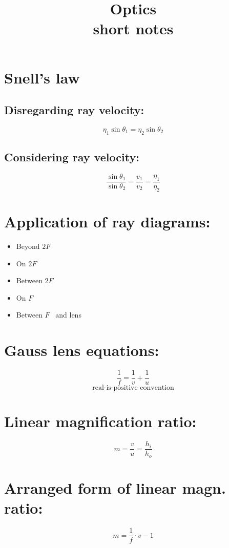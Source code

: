 \documentclass[11pt]{article}
\title{Optics\\
\large short notes
}
\date{}
\begin{document}
\section{Snell's law}
	\subsection{Disregarding ray velocity:}
	 	\[\eta_1\sin\theta_1 = \eta_2\sin\theta_2\]
	 
	\subsection{Considering ray velocity:}
 	 	\[\frac{\sin\theta_1}{\sin\theta_2} = \frac{v_1}{v_2} = \frac{\eta_1}{\eta_2}\]
 	 
\section{Application of ray diagrams:}
 	 
 	 \begin{itemize}
 	 	\item{Beyond $2F$}
 	 	\item{On $2F$}
		\item{Between $2F$}
		\item{On $F$}
		\item{Between $F$ \ and lens}
 	 \end{itemize}
  
\section{Gauss lens equations:}
			\[\frac{1}{f}=\frac{1}{v}+\frac{1}{u}\]
			\[\text{real-is-positive convention}\]

\section{Linear magnification ratio:}

			\[m=\frac{v}{u}=\frac{h_i}{h_o}\]
			
\section{Arranged form of linear magn. ratio:}
			\[m=\frac{1}{f}\cdot v - 1\]
			
\end{document}
